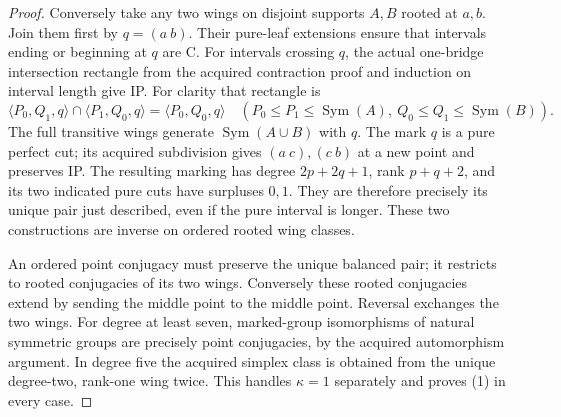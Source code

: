 \documentclass[11pt,a4paper]{article}
\newcommand{\Sym}{\operatorname{Sym}}\newcommand{\gen}[1]{\langle#1\rangle}
\begin{document}
\begin{proof}
Conversely take any two wings on disjoint supports $A,B$ rooted at
$a,b$. Join them first by $q=(a\ b)$. Their pure-leaf extensions
ensure that intervals ending or beginning at $q$ are C. For intervals
crossing $q$, the actual one-bridge intersection rectangle from the
acquired contraction proof and induction on interval length give IP.
For clarity that rectangle is
\[
 \gen{P_0,Q_1,q}\cap\gen{P_1,Q_0,q}=\gen{P_0,Q_0,q}
       \quad(P_0\le P_1\le\Sym(A),\ Q_0\le Q_1\le\Sym(B)).
\]
The full transitive wings generate $\Sym(A\cup B)$ with $q$.
The mark $q$ is a pure perfect cut; its acquired subdivision gives
$(a\ c),(c\ b)$ at a new point and preserves IP. The resulting
marking has degree $2p+2q+1$, rank $p+q+2$, and its two indicated
pure cuts have surpluses $0,1$. They are therefore precisely its
unique pair just described, even if the pure interval is longer.
These two constructions are inverse on ordered rooted wing classes.

An ordered point conjugacy must preserve the unique balanced pair;
it restricts to rooted conjugacies of its two wings. Conversely these
rooted conjugacies extend by sending the middle point to the middle
point. Reversal exchanges the two wings. For degree at least seven,
marked-group isomorphisms of natural symmetric groups are precisely
point conjugacies, by the acquired automorphism argument. In degree
five the acquired simplex class is obtained from the unique degree-two,
rank-one wing twice. This handles $\kappa=1$ separately and proves
(1) in every case.
\end{proof}
\end{document}
